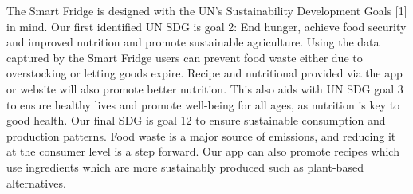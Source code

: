 The Smart Fridge is designed with the UN's Sustainability Development Goals [1] in mind.
Our first identified UN SDG is goal 2: End hunger, achieve food security and improved nutrition and promote sustainable agriculture.
Using the data captured by the Smart Fridge users can prevent food waste either due to overstocking or letting goods expire.
Recipe and nutritional provided via the app or website will also promote better nutrition.
This also aids with UN SDG goal 3 to ensure healthy lives and promote well-being for all ages, as nutrition is key to good health.
Our final SDG is goal 12 to ensure sustainable consumption and production patterns.
Food waste is a major source of emissions, and reducing it at the consumer level is a step forward.
Our app can also promote recipes which use ingredients which are more sustainably produced such as plant-based alternatives.   